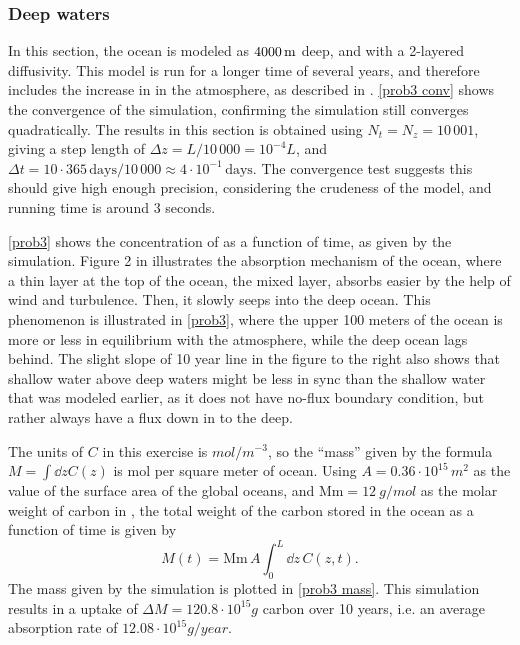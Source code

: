 \documentclass{article}
\begin{document}
    \subsubsection*{Deep waters}

    In this section, the ocean is modeled as $\SI{4\,000}{m}$ deep, and with a 2-layered diffusivity.
    This model is run for a longer time of several years, and therefore includes the increase in  in the atmosphere, as described in \cite{exercise}.
    \autoref{prob3 conv} shows the convergence of the simulation, confirming the simulation still converges quadratically.
    The results in this section is obtained using $N_t = N_z = 10\,001$, giving a step length of $\Delta z = L / 10\,000 = 10^{-4} L $, and $\Delta t = 10 \cdot 365 \, \mathrm{days} / 10\,000 \approx 4 \cdot 10^{-1} \, \mathrm{days}$.
    The convergence test suggests this should give high enough precision, considering the crudeness of the model, and running time is around 3 seconds.

    \autoref{prob3} shows the concentration of  as a function of time, as given by the simulation.
    Figure 2 in \cite{exercise} illustrates the absorption mechanism of the ocean, where a thin layer at the top of the ocean, the mixed layer, absorbs  easier by the help of wind and turbulence.
    Then, it slowly seeps into the deep ocean.
    This phenomenon is illustrated in \autoref{prob3}, where the upper 100 meters of the ocean is more or less in equilibrium with the atmosphere, while the deep ocean lags behind.
    The slight slope of 10 year line in the figure to the right also shows that shallow water above deep waters might be less in sync than the shallow water that was modeled earlier, as it does not have no-flux boundary condition, but rather always have a flux down in to the deep.

    
    The units of $C$ in this exercise is $\si{mol / m^{-3}}$, so the ``mass'' given by the formula $M = \int \dd z C(z)$ is mol per square meter of ocean.
    Using $A = 0.36 \cdot 10^{15}\,\si{m^2}$ as the value of the surface area of the global oceans, and $\mathrm{Mm} = \SI{12}{g / mol}$ as the molar weight of carbon in , the total weight of the carbon stored in the ocean as a function of time is given by
    \begin{equation*}
        M(t) = \mathrm{Mm} \, A \int_0^L \dd z \, C(z, t).
    \end{equation*}
    The mass given by the simulation is plotted in \autoref{prob3 mass}.
    This simulation results in a uptake of $\Delta M = 120.8 \cdot 10^{15} \si{g}$ carbon over 10 years, i.e. an average absorption rate of $12.08 \cdot 10^{15} \si{g/year}$.
\end{document}
